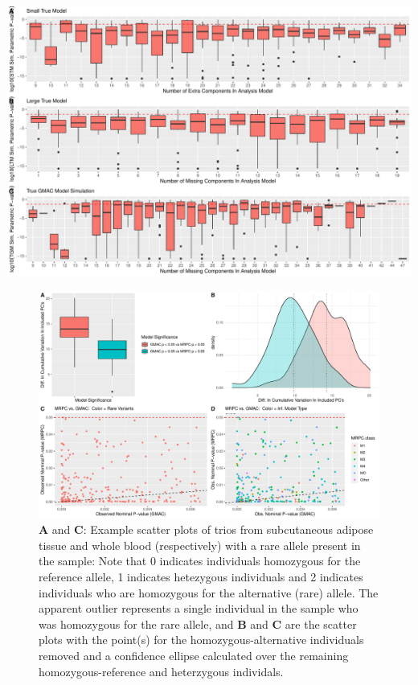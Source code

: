 \documentclass[
]{article}
\begin{document}
\includegraphics{GMACwriteup_files/figure-latex/unnamed-chunk-11-1.pdf}

\begin{figure}
\centering
\includegraphics{GMACwriteup_files/figure-latex/unnamed-chunk-12-1.pdf}
\caption{\textbf{A} and \textbf{C}: Example scatter plots of trios from
subcutaneous adipose tissue and whole blood (respectively) with a rare
allele present in the sample: Note that 0 indicates individuals
homozygous for the reference allele, 1 indicates hetezygous individuals
and 2 indicates individuals who are homozygous for the alternative
(rare) allele. The apparent outlier represents a single individual in
the sample who was homozygous for the rare allele, and \textbf{B} and
\textbf{C} are the scatter plots with the point(s) for the
homozygous-alternative individuals removed and a confidence ellipse
calculated over the remaining homozygous-reference and heterzygous
individals.}
\end{figure}
\end{document}

